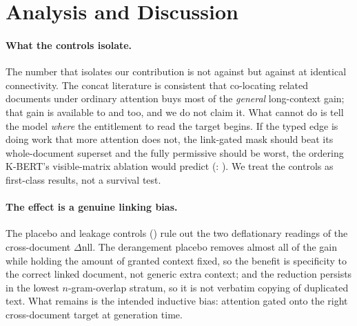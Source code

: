 \section{Analysis and Discussion}
\label{sec:analysis}

\paragraph{What the controls isolate.}
The number that isolates our contribution is not \crossdoc against \doccausal but
\crossdoc against \concatlink at identical connectivity. The concat literature
\citep{yasunaga2022linkbert,shi2024incontext,staniszewski2025structured,yasunaga2022dragon}
is consistent that co-locating related documents under ordinary attention buys most of
the \emph{general} long-context gain; that gain is available to \concatlink and
\concat too, and we do not claim it. What \concatlink cannot do is tell the model
\emph{where} the entitlement to read the target begins. If the typed edge is doing
work that more attention does not, the link-gated mask should beat its whole-document
superset and the fully permissive \concat should be worst, the ordering K-BERT's
visible-matrix ablation \citep{liu2020kbert} would predict
(: ). We treat
the controls as first-class results, not a survival test.

\paragraph{The effect is a genuine linking bias.}
The placebo and leakage controls () rule out the two
deflationary readings of the cross-document $\Delta$nll. The derangement placebo
removes almost all of the gain while holding the amount of granted context fixed, so
the benefit is specificity to the correct linked document, not generic extra context;
and the reduction persists in the lowest $n$-gram-overlap stratum, so it is not
verbatim copying of duplicated text. What remains is the intended inductive bias:
attention gated onto the right cross-document target at generation time.

